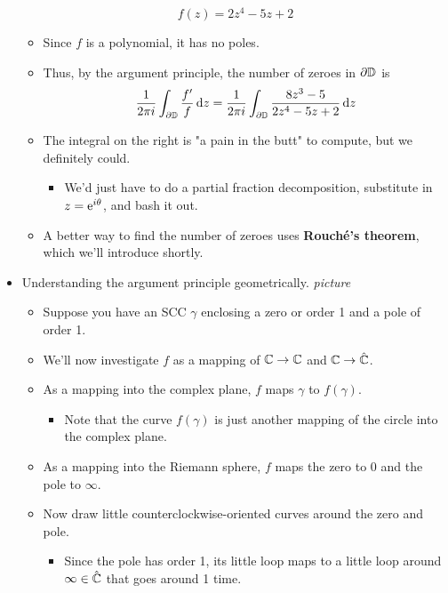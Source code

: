 \documentclass[../notes.tex]{subfiles}
\begin{document}
\begin{itemize}
\begin{equation*}
        f(z) = 2z^4-5z+2
    \end{equation*}
    \begin{itemize}
        \item Since $f$ is a polynomial, it has no poles.
        \item Thus, by the argument principle, the number of zeroes in $\partial\D$ is
        \begin{equation*}
            \frac{1}{2\pi i}\int_{\partial\D}\frac{f'}{f}\dd{z} = \frac{1}{2\pi i}\int_{\partial\D}\frac{8z^3-5}{2z^4-5z+2}\dd{z}
        \end{equation*}
        \item The integral on the right is "a pain in the butt" to compute, but we definitely could.
        \begin{itemize}
            \item We'd just have to do a partial fraction decomposition, substitute in $z=\e[i\theta]$, and bash it out.
        \end{itemize}
        \item A better way to find the number of zeroes uses \textbf{Rouch\'{e}'s theorem}, which we'll introduce shortly.
    \end{itemize}
    \item Understanding the argument principle geometrically.
    \emph{picture}
    \begin{itemize}
        \item Suppose you have an SCC $\gamma$ enclosing a zero or order 1 and a pole of order 1.
        \item We'll now investigate $f$ as a mapping of $\C\to\C$ and $\C\to\hat{\C}$.
        \item As a mapping into the complex plane, $f$ maps $\gamma$ to $f(\gamma)$.
        \begin{itemize}
            \item Note that the curve $f(\gamma)$ is just another mapping of the circle into the complex plane.
        \end{itemize}
        \item As a mapping into the Riemann sphere, $f$ maps the zero to 0 and the pole to $\infty$.
        \item Now draw little counterclockwise-oriented curves around the zero and pole.
        \begin{itemize}
            \item Since the pole has order 1, its little loop maps to a little loop around $\infty\in\hat{\C}$ that goes around 1 time.

\end{itemize}
\end{itemize}
\end{itemize}
\end{document}
